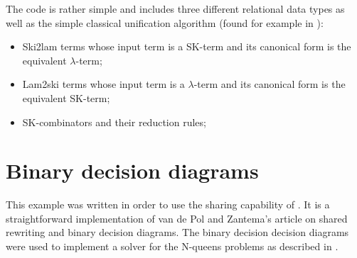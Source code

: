The code is rather simple and includes three different relational
data types as well as the simple classical unification algorithm (found
for example in \cite{BPie02}):
\begin{itemize}
\item Ski2lam terms whose input term is a SK-term and its canonical
  form is the equivalent $\lambda$-term;
\item Lam2ski terms whose input term is a $\lambda$-term and its canonical
  form is the equivalent SK-term;
\item SK-combinators and their reduction rules;
\end{itemize}

\section{Binary decision diagrams}
\label{sec:bdd}

This example was written in order to use the sharing capability of
\moca. It is a straightforward implementation of van de Pol and
Zantema's article \cite{JVdPolHZan00} on shared rewriting and binary
decision diagrams. The binary decision decision
diagrams were used to implement a solver for the N-queens problems as
described in \cite{HRAnd97}.

